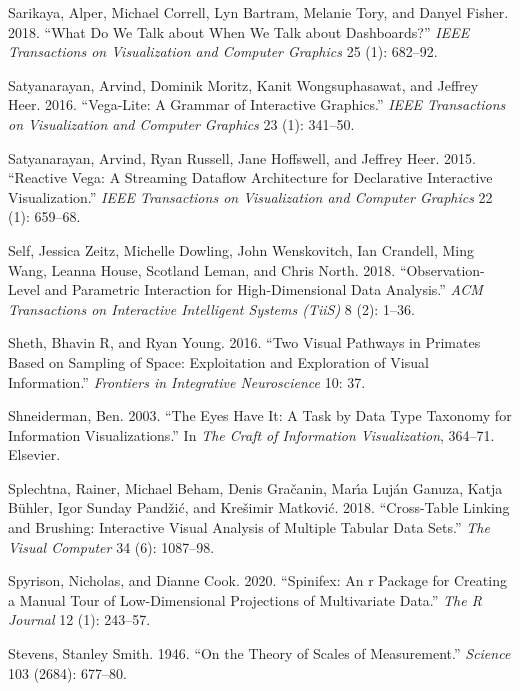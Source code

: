 \documentclass[
]{book}
\newlength{\cslhangindent}
\newenvironment{CSLReferences}[2] %
 {\begin{list}{}{%
  \setlength{\itemindent}{0pt}
  \setlength{\leftmargin}{0pt}
  \setlength{\parsep}{0pt}
  \ifodd #1
   \setlength{\leftmargin}{\cslhangindent}
   \setlength{\itemindent}{-1\cslhangindent}
  \fi
  \setlength{\itemsep}{#2\baselineskip}}}
 {\end{list}}
\begin{document}
\begin{CSLReferences}{1}{0}
Sarikaya, Alper, Michael Correll, Lyn Bartram, Melanie Tory, and Danyel Fisher. 2018. {``What Do We Talk about When We Talk about Dashboards?''} \emph{IEEE Transactions on Visualization and Computer Graphics} 25 (1): 682--92.

Satyanarayan, Arvind, Dominik Moritz, Kanit Wongsuphasawat, and Jeffrey Heer. 2016. {``Vega-Lite: A Grammar of Interactive Graphics.''} \emph{IEEE Transactions on Visualization and Computer Graphics} 23 (1): 341--50.

Satyanarayan, Arvind, Ryan Russell, Jane Hoffswell, and Jeffrey Heer. 2015. {``Reactive Vega: A Streaming Dataflow Architecture for Declarative Interactive Visualization.''} \emph{IEEE Transactions on Visualization and Computer Graphics} 22 (1): 659--68.

Self, Jessica Zeitz, Michelle Dowling, John Wenskovitch, Ian Crandell, Ming Wang, Leanna House, Scotland Leman, and Chris North. 2018. {``Observation-Level and Parametric Interaction for High-Dimensional Data Analysis.''} \emph{ACM Transactions on Interactive Intelligent Systems (TiiS)} 8 (2): 1--36.

Sheth, Bhavin R, and Ryan Young. 2016. {``Two Visual Pathways in Primates Based on Sampling of Space: Exploitation and Exploration of Visual Information.''} \emph{Frontiers in Integrative Neuroscience} 10: 37.

Shneiderman, Ben. 2003. {``The Eyes Have It: A Task by Data Type Taxonomy for Information Visualizations.''} In \emph{The Craft of Information Visualization}, 364--71. Elsevier.

Splechtna, Rainer, Michael Beham, Denis Gračanin, Marı́a Luján Ganuza, Katja Bühler, Igor Sunday Pandžić, and Krešimir Matković. 2018. {``Cross-Table Linking and Brushing: Interactive Visual Analysis of Multiple Tabular Data Sets.''} \emph{The Visual Computer} 34 (6): 1087--98.

Spyrison, Nicholas, and Dianne Cook. 2020. {``Spinifex: An r Package for Creating a Manual Tour of Low-Dimensional Projections of Multivariate Data.''} \emph{The R Journal} 12 (1): 243--57.

Stevens, Stanley Smith. 1946. {``On the Theory of Scales of Measurement.''} \emph{Science} 103 (2684): 677--80.


\end{CSLReferences}
\end{document}
